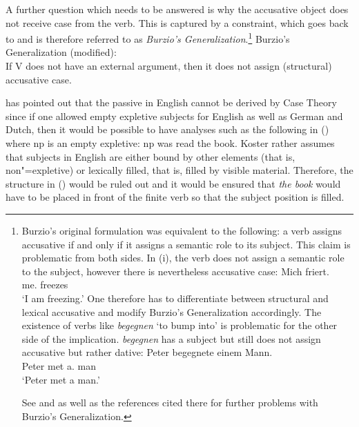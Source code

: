 A further question which needs to be answered is why the accusative object does not receive case from the verb.
This is captured by a constraint, which goes back to \citet[--185]{Burzio86a-u-gekauft} and is therefore
referred to as \emph{Burzio's Generalization}.\footnote{
Burzio's original formulation was equivalent to the following: a verb assigns accusative if and only if it assigns
a semantic role to its subject.
This claim is problematic from both sides. In (i), the verb does not assign a semantic role to the subject, however
there is nevertheless accusative case:
\ea
\gll Mich friert.\\
	 me.\acc{} freezes\\
\glt `I am freezing.'
\z
One therefore has to differentiate between structural and lexical accusative and modify Burzio's Generalization
accordingly. The existence of verbs like \emph{begegnen} `to bump into' is problematic for the other side of
the implication. \emph{begegnen} has a subject but still does not assign accusative but rather
dative:
\ea
\gll Peter begegnete einem Mann.\\
     Peter met a.\dat{} man\\
\glt `Peter met a man.'
\z

See  and  as well as the references cited there for further problems
with Burzio's Generalization.
}
\ea
Burzio's Generalization (modified):\\
If V does not have an external argument, then it does not assign (structural) accusative case.
\z

\noindent
\citet[]{Koster86a} has pointed out that the passive in English cannot be derived by Case
Theory since if one allowed empty expletive subjects for English as well as German and Dutch, then it would be possible
to have analyses such as the following in () where np is an empty expletive:
\ea
np was read the book.
\z
Koster rather assumes that subjects in English are either bound by other elements (that is, non"=expletive) or lexically filled, that
is, filled by visible material.
Therefore, the structure in () would be ruled out and it would be ensured that \emph{the book} would have to be placed in front
of the finite verb so that the subject position is filled.

